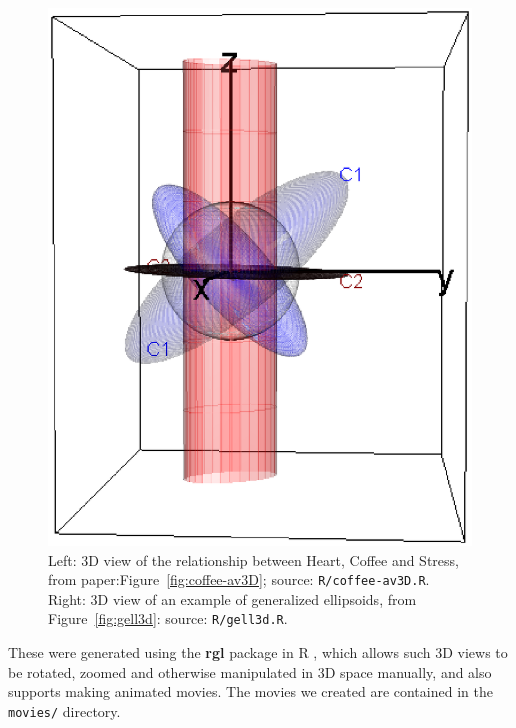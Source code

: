 \documentclass[11pt]{article}%
\newcommand*{\figref}[1]{Figure~\ref{#1}}
\newcommand*{\pkg}[1]{\textbf{#1}}     %
\newcommand*{\file}[1]{\texttt{#1}}     %
\begin{document}
\begin{figure}[htb]
\begin{minipage}[b]{.49\linewidth}
  \includegraphics[width=1\linewidth]{fig/gell3d-4}
 \end{minipage}
  \caption{Left: 3D view of the relationship between Heart, Coffee and Stress, from paper:\figref{fig:coffee-av3D}; source: \file{R/coffee-av3D.R}.
  Right: 3D view of an example of generalized ellipsoids, from \figref{fig:gell3d}: source: \file{R/gell3d.R}.  
  }
  \label{fig:supp3D}
\end{figure}

These were generated using the \pkg{rgl} package in R \citep{rgl}, 
which allows such 3D views to be rotated, zoomed
and otherwise manipulated in 3D space manually, and also supports making animated movies. The movies we created
are contained in the \file{movies/} directory.

% 
% 
% 
% 


\end{document}
